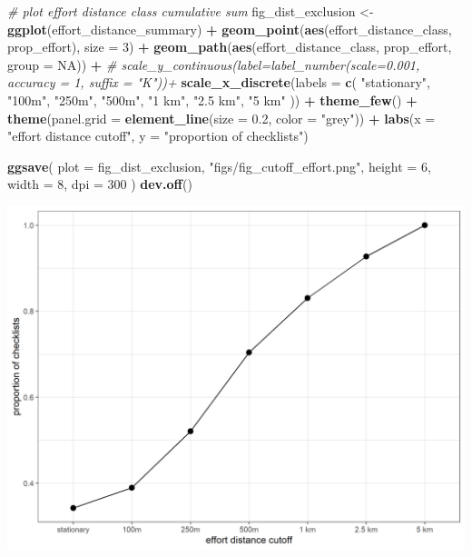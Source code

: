 \documentclass[]{article}
\newenvironment{Shaded}{\begin{snugshade}}{\end{snugshade}}
\newcommand{\CommentTok}[1]{\textcolor[rgb]{0.56,0.35,0.01}{\textit{#1}}}
\newcommand{\DataTypeTok}[1]{\textcolor[rgb]{0.13,0.29,0.53}{#1}}
\newcommand{\DecValTok}[1]{\textcolor[rgb]{0.00,0.00,0.81}{#1}}
\newcommand{\FloatTok}[1]{\textcolor[rgb]{0.00,0.00,0.81}{#1}}
\newcommand{\KeywordTok}[1]{\textcolor[rgb]{0.13,0.29,0.53}{\textbf{#1}}}
\newcommand{\NormalTok}[1]{#1}
\newcommand{\OperatorTok}[1]{\textcolor[rgb]{0.81,0.36,0.00}{\textbf{#1}}}
\newcommand{\OtherTok}[1]{\textcolor[rgb]{0.56,0.35,0.01}{#1}}
\newcommand{\StringTok}[1]{\textcolor[rgb]{0.31,0.60,0.02}{#1}}
\begin{document}
\begin{Shaded}
\begin{Highlighting}[numbers=left,,]
\CommentTok{# plot effort distance class cumulative sum}
\NormalTok{fig_dist_exclusion <-}\StringTok{ }\KeywordTok{ggplot}\NormalTok{(effort_distance_summary) }\OperatorTok{+}
\StringTok{  }\KeywordTok{geom_point}\NormalTok{(}\KeywordTok{aes}\NormalTok{(effort_distance_class, prop_effort), }\DataTypeTok{size =} \DecValTok{3}\NormalTok{) }\OperatorTok{+}
\StringTok{  }\KeywordTok{geom_path}\NormalTok{(}\KeywordTok{aes}\NormalTok{(effort_distance_class, prop_effort, }\DataTypeTok{group =} \OtherTok{NA}\NormalTok{)) }\OperatorTok{+}
\StringTok{  }\CommentTok{# scale_y_continuous(label=label_number(scale=0.001, accuracy = 1, suffix = "K"))+}
\StringTok{  }\KeywordTok{scale_x_discrete}\NormalTok{(}\DataTypeTok{labels =} \KeywordTok{c}\NormalTok{(}
    \StringTok{"stationary"}\NormalTok{, }\StringTok{"100m"}\NormalTok{, }\StringTok{"250m"}\NormalTok{,}
    \StringTok{"500m"}\NormalTok{, }\StringTok{"1 km"}\NormalTok{, }\StringTok{"2.5 km"}\NormalTok{, }\StringTok{"5 km"}
\NormalTok{  )) }\OperatorTok{+}
\StringTok{  }\KeywordTok{theme_few}\NormalTok{() }\OperatorTok{+}
\StringTok{  }\KeywordTok{theme}\NormalTok{(}\DataTypeTok{panel.grid =} \KeywordTok{element_line}\NormalTok{(}\DataTypeTok{size =} \FloatTok{0.2}\NormalTok{, }\DataTypeTok{color =} \StringTok{"grey"}\NormalTok{)) }\OperatorTok{+}
\StringTok{  }\KeywordTok{labs}\NormalTok{(}\DataTypeTok{x =} \StringTok{"effort distance cutoff"}\NormalTok{, }\DataTypeTok{y =} \StringTok{"proportion of checklists"}\NormalTok{)}

\KeywordTok{ggsave}\NormalTok{(}
  \DataTypeTok{plot =}\NormalTok{ fig_dist_exclusion, }\StringTok{"figs/fig_cutoff_effort.png"}\NormalTok{,}
  \DataTypeTok{height =} \DecValTok{6}\NormalTok{, }\DataTypeTok{width =} \DecValTok{8}\NormalTok{, }\DataTypeTok{dpi =} \DecValTok{300}
\NormalTok{)}
\KeywordTok{dev.off}\NormalTok{()}
\end{Highlighting}
\end{Shaded}

\includegraphics{figs/fig_cutoff_effort.png}
\end{document}
